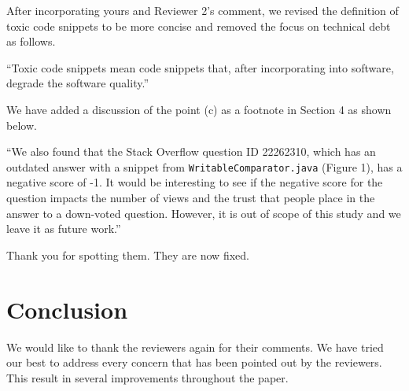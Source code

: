 \documentclass[a4paper,twoside,10pt]{reviewresponse}
\begin{document}

After incorporating yours and Reviewer 2's comment, we revised the definition of toxic code snippets to be more concise and removed the focus on technical debt as follows.

``Toxic code snippets mean code snippets that, after incorporating into software, degrade the software quality.''


We have added a discussion of the point (c) as a footnote in Section 4 as shown below.

``We also found that the Stack Overflow question ID 22262310, which has an outdated answer with a snippet from \texttt{WritableComparator.java} (Figure 1), has a negative score of -1. It would be interesting to see if the negative score for the question impacts the number of views and the trust that people place in the answer to a down-voted question. However, it is out of scope of this study and we leave it as future work.''


Thank you for spotting them. They are now fixed.

\section{Conclusion}
We would like to thank the reviewers again for their comments.
We have tried our best to address every concern that has been pointed out by the reviewers. This result in several improvements throughout the paper.

%


\end{document}
